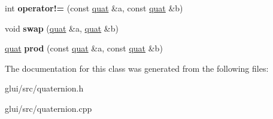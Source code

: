 \begin{DoxyCompactItemize}
\item 
\hypertarget{classquat_a76b6b58902bf431c7c193e1720b0b182}{int {\bfseries operator!=} (const \hyperlink{classquat}{quat} \&a, const \hyperlink{classquat}{quat} \&b)}\label{classquat_a76b6b58902bf431c7c193e1720b0b182}

\item 
\hypertarget{classquat_a465e9ab76658bed899ad8095a17647c0}{void {\bfseries swap} (\hyperlink{classquat}{quat} \&a, \hyperlink{classquat}{quat} \&b)}\label{classquat_a465e9ab76658bed899ad8095a17647c0}

\item 
\hypertarget{classquat_a788864b84ce05a4c86cbd7edcd5adb24}{\hyperlink{classquat}{quat} {\bfseries prod} (const \hyperlink{classquat}{quat} \&a, const \hyperlink{classquat}{quat} \&b)}\label{classquat_a788864b84ce05a4c86cbd7edcd5adb24}

\end{DoxyCompactItemize}


The documentation for this class was generated from the following files\-:\begin{DoxyCompactItemize}
\item 
glui/src/quaternion.\-h\item 
glui/src/quaternion.\-cpp\end{DoxyCompactItemize}
